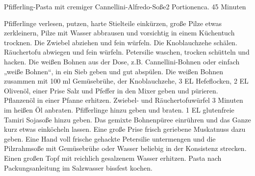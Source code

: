 \documentclass[a4paper,10pt]{article}
\begin{document}
    \newpage
    
    \begin{recipe}{Pfifferling-Pasta mit cremiger Cannellini-Alfredo-Soße}{2 
Portionen}{ca. 45 Minuten}
               
        \freeform \hfill 
        
	Pfifferlinge verlesen, putzen, harte Stielteile einkürzen, große 
	Pilze etwas zerkleinern, Pilze mit Wasser abbrausen und vorsichtig in 
	einem Küchentuch trocknen. 
        Die Zwiebel abziehen und fein würfeln. Die Knoblauchzehe schälen. 
	Räuchertofu abwiegen und fein würfeln. Petersilie waschen, trocken 
	schütteln und hacken. 
	Die weißen Bohnen aus der Dose, z.B. Cannellini-Bohnen oder einfach 
	„weiße Bohnen“, in ein Sieb geben und gut abspülen. Die weißen 
	Bohnen zusammen mit 100 ml Gemüsebrühe, der Knoblauchzehe, 3 EL 
	Hefeflocken, 2 EL Olivenöl, einer Prise Salz und Pfeffer in den Mixer 
	geben und pürieren.
	Pflanzenöl in einer Pfanne erhitzen. Zwiebel- und Räuchertofuwürfel 3 
	Minuten im heißen Öl anbraten. Pfifferlinge hinzu geben und braten.
	1 EL glutenfreie Tamiri Sojasoße hinzu geben. Das gemixte Bohnenpüree 
	einrühren und das Ganze kurz etwas einköcheln lassen. Eine große Prise 
	frisch geriebene Muskatnuss dazu geben. Eine Hand voll frische 
	gehackte Petersilie untermengen und die Pilzrahmsoße mit Gemüsebrühe 
	oder Wasser beliebig in der Konsistenz strecken.        
        Einen großen Topf mit reichlich gesalzenem Wasser erhitzen. Pasta nach 
	Packungsanleitung im Salzwasser bissfest kochen.


\end{recipe}
\end{document}
